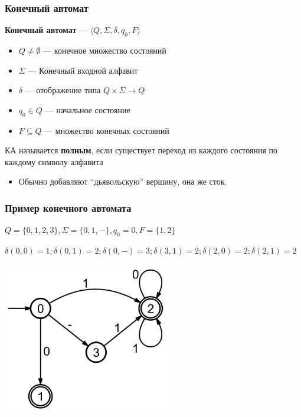\documentclass{beamer}
\begin{document}
\begin{frame}[fragile]
  \transwipe[direction=90]
  \frametitle{Конечный автомат}
  \textbf{Конечный автомат} --- $\langle Q, \Sigma, \delta, q_0, F \rangle$
  \begin{itemize}
    \item $Q \neq \emptyset$ --- конечное множество состояний
    \item $\Sigma$ --- Конечный входной алфавит
    \item $\delta$ --- отображение типа $Q \times \Sigma \rightarrow Q$
    \item $q_0 \in Q$ --- начальное состояние
    \item $F \subseteq Q$ --- множество конечных состояний
  \end{itemize}

  КА называется \textbf{полным}, если существует переход из каждого состояния по каждому символу алфавита
\begin{itemize}
    \item Обычно добавляют ``дьявольскую'' вершину, она же сток. 
\end{itemize}
\end{frame}


\begin{frame}[fragile]
  \transwipe[direction=90]
  \frametitle{Пример конечного автомата}

 $Q = \{ 0, 1, 2, 3\}, \Sigma = \{ 0, 1, -\}, q_0 = 0, F = \{1, 2\}$
 
 $\delta (0, 0) = 1; \delta (0, 1) = 2; \delta (0, -) = 3; \delta (3, 1) = 2; \delta (2, 0) = 2; \delta (2, 1) = 2 $ 

  \begin{center}
     \includegraphics[width=0.55\textwidth]{pics/automaton.png}  
   \end{center}
\end{frame}
\end{document}
